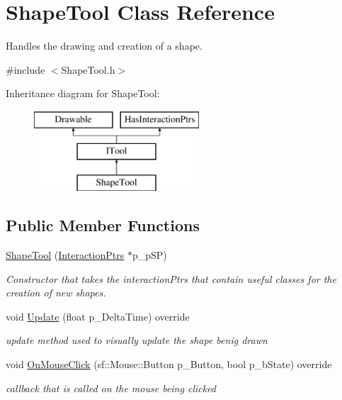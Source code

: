 \hypertarget{class_shape_tool}{}\section{Shape\+Tool Class Reference}
\label{class_shape_tool}


Handles the drawing and creation of a shape.  




{\ttfamily \#include $<$Shape\+Tool.\+h$>$}

Inheritance diagram for Shape\+Tool\+:\begin{figure}[H]
\begin{center}
\leavevmode
\includegraphics[height=3.000000cm]{class_shape_tool}
\end{center}
\end{figure}
\subsection*{Public Member Functions}
\begin{DoxyCompactItemize}
\item 
\mbox{\label{class_shape_tool_a2d31f92499677b36c002b26af0bcd147}} 
\hyperlink{class_shape_tool_a2d31f92499677b36c002b26af0bcd147}{Shape\+Tool} (\hyperlink{struct_interaction_ptrs}{Interaction\+Ptrs} $\ast$p\+\_\+p\+SP)
\begin{DoxyCompactList}\small\item\em Constructor that takes the interaction\+Ptrs that contain useful classes for the creation of new shapes. \end{DoxyCompactList}\item 
\mbox{\label{class_shape_tool_a098c92b3a500ab0626c73e078dbdbddc}} 
void \hyperlink{class_shape_tool_a098c92b3a500ab0626c73e078dbdbddc}{Update} (float p\+\_\+\+Delta\+Time) override
\begin{DoxyCompactList}\small\item\em update method used to visually update the shape benig drawn \end{DoxyCompactList}\item 
\mbox{\label{class_shape_tool_a96dbd9eb07a88d3855d5f2fbd71f5474}} 
void \hyperlink{class_shape_tool_a96dbd9eb07a88d3855d5f2fbd71f5474}{On\+Mouse\+Click} (sf\+::\+Mouse\+::\+Button p\+\_\+\+Button, bool p\+\_\+b\+State) override
\begin{DoxyCompactList}\small\item\em callback that is called on the mouse being clicked \end{DoxyCompactList}\end{DoxyCompactItemize}
